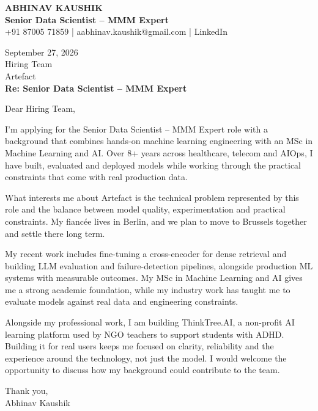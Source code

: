 \documentclass[10pt,a4paper]{article}
\begin{document}
\begin{center}
{\Large\bfseries ABHINAV KAUSHIK}\\[2pt]
{\bfseries Senior Data Scientist – MMM Expert}\\[2pt]
+91 87005 71859 \quad | \quad aabhinav.kaushik@gmail.com \quad | \quad LinkedIn
\end{center}
\vspace{8pt}
September 27, 2026\\[6pt]
Hiring Team\\
Artefact\\[4pt]
\textbf{Re: Senior Data Scientist – MMM Expert}

Dear Hiring Team,

I’m applying for the Senior Data Scientist – MMM Expert role with a background that combines hands-on machine learning engineering with an MSc in Machine Learning and AI. Over 8+ years across healthcare, telecom and AIOps, I have built, evaluated and deployed models while working through the practical constraints that come with real production data.

What interests me about Artefact is the technical problem represented by this role and the balance between model quality, experimentation and practical constraints. My fiancée lives in Berlin, and we plan to move to Brussels together and settle there long term.

My recent work includes fine-tuning a cross-encoder for dense retrieval and building LLM evaluation and failure-detection pipelines, alongside production ML systems with measurable outcomes. My MSc in Machine Learning and AI gives me a strong academic foundation, while my industry work has taught me to evaluate models against real data and engineering constraints.

Alongside my professional work, I am building ThinkTree.AI, a non-profit AI learning platform used by NGO teachers to support students with ADHD. Building it for real users keeps me focused on clarity, reliability and the experience around the technology, not just the model. I would welcome the opportunity to discuss how my background could contribute to the team.

Thank you,\\
Abhinav Kaushik
\end{document}
